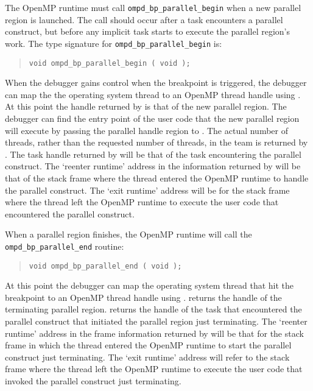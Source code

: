The OpenMP runtime must call \texttt{ompd\_bp\_parallel\_begin}
when a new parallel region is launched.
The call should  occur after a task encounters a parallel construct,
but before any implicit task starts to execute the parallel
region's work.
The type signature for \texttt{ompd\_bp\_parallel\_begin} is:
\begin{quote}
\begin{lstlisting}
void ompd_bp_parallel_begin ( void );
\end{lstlisting}
\end{quote}

When the debugger gains control when the breakpoint is triggered,
the debugger can map the the operating system thread to an OpenMP
thread handle using
.
At this point the handle returned by
is that of the new parallel region.
The debugger can find the entry point of the user code that
the new parallel region will execute by passing the parallel handle region
to .
The actual number of threads, rather than the requested number of threads,
in the team is returned by
.
The task handle returned by
will be that of the task encountering the parallel construct.
The `reenter runtime' address in the information returned by
will be that of the stack frame where the thread entered the OpenMP
runtime to handle the parallel construct.
The `exit runtime' address will be for the stack frame where the thread
left the OpenMP runtime to execute the user code that encountered
the parallel construct.

When a parallel region finishes, the OpenMP runtime will call
the \texttt{ompd\_bp\_parallel\_end} routine:
\begin{quote}
\begin{lstlisting}
void ompd_bp_parallel_end ( void );
\end{lstlisting}
\end{quote}
At this point the debugger can map the operating system thread that
hit the breakpoint to an OpenMP thread handle using
.
returns the handle of the terminating parallel region.
returns the handle of the task that encountered the
parallel construct that initiated the parallel region just
terminating.
The `reenter runtime' address in the frame information returned by
will be that for the stack frame in which the thread entered the
OpenMP runtime to start the parallel construct just terminating.
The `exit runtime' address will refer to the stack frame where the
thread left the OpenMP runtime to execute the user code that
invoked the parallel construct just terminating.

